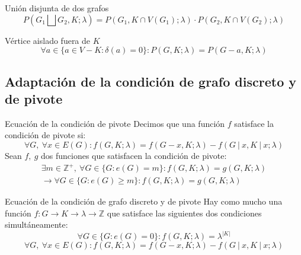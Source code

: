\documentclass{beamer}
\begin{document}
\begin{frame}{Unión disjunta de dos grafos}
    \begin{equation*}
        P(G_1 \bigsqcup G_2, K; \lambda) = P(G_1, K \cap V(G_1); \lambda) \cdot P(G_2, K \cap V(G_2); \lambda)
    \end{equation*}
\end{frame}

\begin{frame}{Vértice aislado fuera de $K$}
    \begin{equation*}
        \forall a \in \{a \in V - K : \delta(a) = 0\} : P(G, K; \lambda) = P(G - a, K; \lambda)
    \end{equation*}
\end{frame}

\subsection{Adaptación de la condición de grafo discreto y de pivote}

\begin{frame}{Ecuación de la condición de pivote}
    Decimos que una función $f$ satisface la condición de pivote si:
    \begin{equation*}
        \forall G,\ \forall x \in E(G) : f(G, K; \lambda) = f(G - x, K; \lambda) - f(G\ |\ x, K\ |\ x; \lambda)
    \end{equation*}
    Sean $f,\ g$ dos funciones que satisfacen la condición de pivote:
    \begin{multline*}
        \exists m \in \mathbb{Z}^+,\ \forall G \in \{G : e(G) = m\} : f(G, K; \lambda) = g(G, K; \lambda)
        \\
        \rightarrow \forall G \in \{G : e(G) \geq m\} : f(G, K; \lambda) = g(G, K; \lambda)
    \end{multline*}
\end{frame}

\begin{frame}{Ecuación de la condición de grafo discreto y de pivote}
    Hay como mucho una función $f : G \rightarrow K \rightarrow \lambda \rightarrow \mathbb{Z}$ que satisface las siguientes dos condiciones simultáneamente:
    \begin{equation*}
        \forall G \in \{G : e(G) = 0\} : f(G, K; \lambda) = \lambda^{|K|}
    \end{equation*}
    \begin{equation*}
        \forall G,\ \forall x \in E(G) : f(G, K; \lambda) = f(G - x, K; \lambda) - f(G\ |\ x, K\ |\ x; \lambda)
    \end{equation*}
\end{frame}
\end{document}
